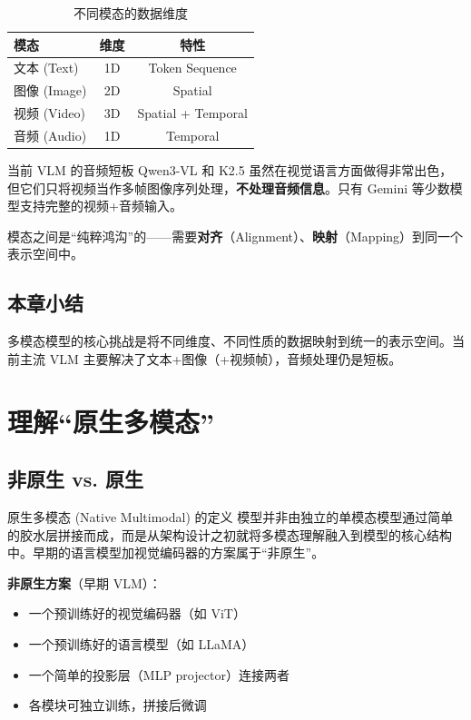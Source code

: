\documentclass[a4paper]{article}
\begin{document}
\begin{table}[H]
\centering
\caption{不同模态的数据维度}
\begin{tabular}{lcc}
\toprule
\textbf{模态} & \textbf{维度} & \textbf{特性} \\
\midrule
文本 (Text) & 1D & Token Sequence \\
图像 (Image) & 2D & Spatial \\
视频 (Video) & 3D & Spatial + Temporal \\
音频 (Audio) & 1D & Temporal \\
\bottomrule
\end{tabular}
\end{table}

\begin{warningbox}{当前 VLM 的音频短板}
Qwen3-VL 和 K2.5 虽然在视觉语言方面做得非常出色，但它们只将视频当作多帧图像序列处理，\textbf{不处理音频信息}。只有 Gemini 等少数模型支持完整的视频+音频输入。
\end{warningbox}

模态之间是``纯粹鸿沟''的——需要\textbf{对齐}（Alignment）、\textbf{映射}（Mapping）到同一个表示空间中。

\subsection{本章小结}

多模态模型的核心挑战是将不同维度、不同性质的数据映射到统一的表示空间。当前主流 VLM 主要解决了文本+图像（+视频帧），音频处理仍是短板。

\section{理解``原生多模态''}

\subsection{非原生 vs. 原生}

\begin{importantbox}{原生多模态 (Native Multimodal) 的定义}
模型并非由独立的单模态模型通过简单的胶水层拼接而成，而是从架构设计之初就将多模态理解融入到模型的核心结构中。早期的语言模型加视觉编码器的方案属于``非原生''。
\end{importantbox}

\textbf{非原生方案}（早期 VLM）：
\begin{itemize}
  \item 一个预训练好的视觉编码器（如 ViT）
  \item 一个预训练好的语言模型（如 LLaMA）
  \item 一个简单的投影层（MLP projector）连接两者
  \item 各模块可独立训练，拼接后微调
\end{itemize}
\end{document}

